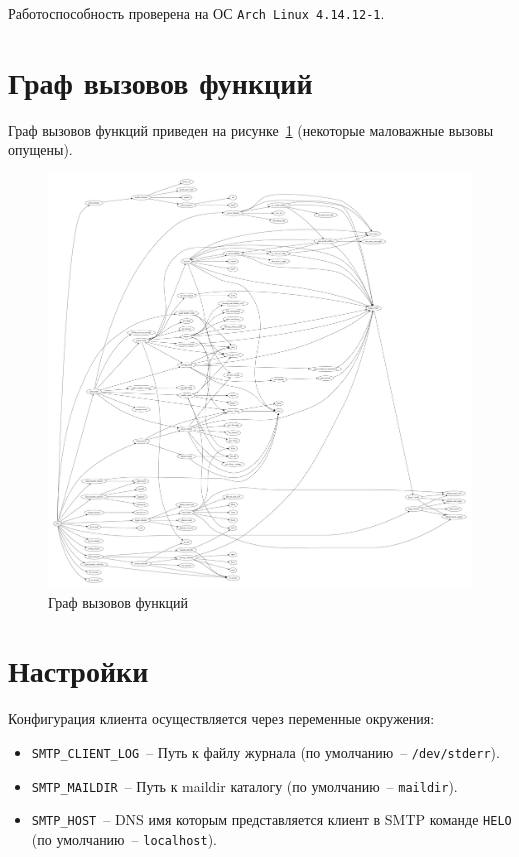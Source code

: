 \documentclass[a4paper,12pt]{report}
\begin{document}
Работоспособность проверена на ОС \texttt{Arch Linux 4.14.12-1}.

\section{Граф вызовов функций}

Граф вызовов функций приведен на рисунке~\ref{fig:flow} (некоторые маловажные
вызовы опущены).
\begin{figure}
\centering
\includegraphics[width=\textwidth]{.tmp/report/flow.pdf}
\caption{Граф вызовов функций}
\label{fig:flow}
\end{figure}

\section{Настройки}

Конфигурация клиента осуществляется через переменные окружения:
\begin{itemize}
\item \texttt{SMTP\_CLIENT\_LOG}~-- Путь к файлу журнала (по умолчанию~--
      \texttt{/dev/stderr}).
\item \texttt{SMTP\_MAILDIR}~-- Путь к maildir каталогу (по умолчанию~--
      \texttt{maildir}).
\item \texttt{SMTP\_HOST}~-- DNS имя которым представляется клиент в SMTP
      команде \texttt{HELO} (по умолчанию~-- \texttt{localhost}).
\end{itemize}
\end{document}
